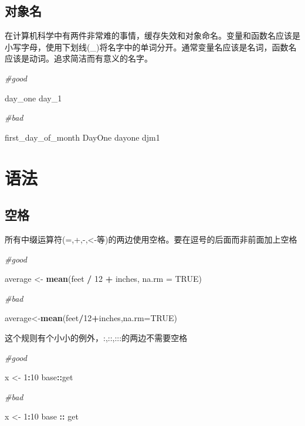 \documentclass[]{book}
\newenvironment{Shaded}{\begin{snugshade}}{\end{snugshade}}
\newcommand{\KeywordTok}[1]{\textcolor[rgb]{0.13,0.29,0.53}{\textbf{#1}}}
\newcommand{\DataTypeTok}[1]{\textcolor[rgb]{0.13,0.29,0.53}{#1}}
\newcommand{\DecValTok}[1]{\textcolor[rgb]{0.00,0.00,0.81}{#1}}
\newcommand{\StringTok}[1]{\textcolor[rgb]{0.31,0.60,0.02}{#1}}
\newcommand{\CommentTok}[1]{\textcolor[rgb]{0.56,0.35,0.01}{\textit{#1}}}
\newcommand{\OtherTok}[1]{\textcolor[rgb]{0.56,0.35,0.01}{#1}}
\newcommand{\OperatorTok}[1]{\textcolor[rgb]{0.81,0.36,0.00}{\textbf{#1}}}
\newcommand{\NormalTok}[1]{#1}
\begin{document}
\subsection{对象名}

在计算机科学中有两件非常难的事情，缓存失效和对象命名。变量和函数名应该是小写字母，使用下划线(\_)将名字中的单词分开。通常变量名应该是名词，函数名应该是动词。追求简洁而有意义的名字。

\begin{Shaded}
\begin{Highlighting}[]
\CommentTok{#good}

\NormalTok{day_one}
\NormalTok{day_}\DecValTok{1}

\CommentTok{#bad}

\NormalTok{first_day_of_month}
\NormalTok{DayOne}
\NormalTok{dayone}
\NormalTok{djm1}
\end{Highlighting}
\end{Shaded}

\section{语法}

\subsection{空格}

所有中缀运算符(=,+,-,\textless{}-等)的两边使用空格。要在逗号的后面而非前面加上空格

\begin{Shaded}
\begin{Highlighting}[]
\CommentTok{#good}

\NormalTok{average <-}\StringTok{ }\KeywordTok{mean}\NormalTok{(feet }\OperatorTok{/}\StringTok{ }\DecValTok{12} \OperatorTok{+}\StringTok{ }\NormalTok{inches, }\DataTypeTok{na.rm =} \OtherTok{TRUE}\NormalTok{)}

\CommentTok{#bad}

\NormalTok{average<-}\KeywordTok{mean}\NormalTok{(feet}\OperatorTok{/}\DecValTok{12}\OperatorTok{+}\NormalTok{inches,}\DataTypeTok{na.rm=}\OtherTok{TRUE}\NormalTok{)}
\end{Highlighting}
\end{Shaded}

这个规则有个小小的例外，:,::,:::的两边不需要空格

\begin{Shaded}
\begin{Highlighting}[]
\CommentTok{#good}

\NormalTok{x <-}\StringTok{ }\DecValTok{1}\OperatorTok{:}\DecValTok{10}
\NormalTok{base}\OperatorTok{::}\NormalTok{get}

\CommentTok{#bad}

\NormalTok{x <-}\StringTok{ }\DecValTok{1}\OperatorTok{:}\DecValTok{10}
\NormalTok{base }\OperatorTok{::}\StringTok{ }\NormalTok{get}
\end{Highlighting}
\end{Shaded}
\end{document}
